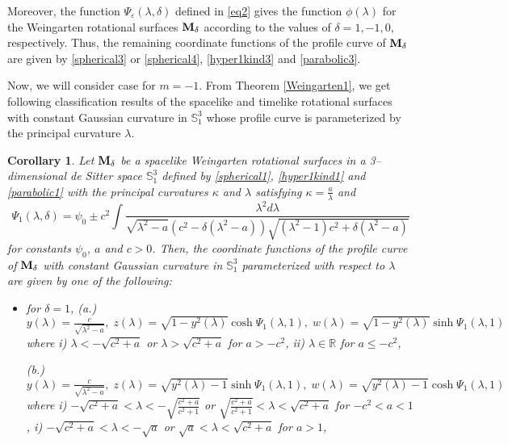 \documentclass{amsart}
\newtheorem{Corollary}[Theorem]{Corollary}
\theoremstyle{definition}
\numberwithin{equation}{section}
\begin{document}
Moreover, the function $\Psi_{\varepsilon}(\lambda,\delta)$
defined in \eqref{eq2} gives the function $\phi(\lambda)$ for the Weingarten rotational surfaces ${\bf M}_{\delta}$ according to the values of $\delta=1,-1,0$, respectively. 
Thus, the remaining coordinate functions of the profile curve of 
${\bf M}_{\delta}$
are given by \eqref{spherical3} or \eqref{spherical4}, \eqref{hyper1kind3} and \eqref{parabolic3}.

Now, we will consider case for $m=-1$. 
From Theorem \ref{Weingarten1}, we get following classification results of 
the spacelike and timelike rotational surfaces with constant Gaussian curvature in $\mathbb{S}^3_1$ whose profile curve is parameterized by the principal curvature $\lambda$. 
\begin{Corollary}
\label{spacelikeWeingarten1}
Let ${\bf M}_\delta$ be a spacelike Weingarten rotational surfaces in a 3--dimensional de Sitter space $\mathbb{S}^3_1$ defined by \eqref{spherical1}, \eqref{hyper1kind1} and 
\eqref{parabolic1} with the principal curvatures $\kappa$ and $\lambda$
satisfying $\kappa=\frac{a}{\lambda}$ and 
\begin{equation}
    \Psi_{1}(\lambda,\delta)=\psi_0\pm 
    c^2\int{\frac{\lambda^2 d\lambda}{\sqrt{\lambda^2-a}(c^2-\delta(\lambda^2-a))
    \sqrt{(\lambda^2-1)c^2+\delta(\lambda^2-a)}}}
\end{equation}
for constants $\psi_0$, $a$ and $c>0$.
Then, the coordinate functions of the profile curve of ${\bf M}_\delta$ with 
constant Gaussian curvature in $\mathbb{S}^3_1$ parameterized with respect to 
$\lambda$ are given by one of the following:
\begin{itemize}
    \item [1.] for $\delta=1$,
    \subitem (a.)
    $y(\lambda)=\frac{c}{\sqrt{\lambda^2-a}},\; 
    z(\lambda)=\sqrt{1-y^2(\lambda)}\cosh{\Psi_1(\lambda,1)},\;
    w(\lambda)=\sqrt{1-y^2(\lambda)}\sinh{\Psi_1(\lambda,1)}$
    where
    \subsubitem i) $\lambda<-\sqrt{c^2+a}$ or $\lambda>\sqrt{c^2+a}$ for $a>-c^2$,
    \subsubitem ii) $\lambda\in\mathbb{R}$ for 
    $a\leq -c^2$,
    
    \subitem (b.) 
     $y(\lambda)=\frac{c}{\sqrt{\lambda^2-a}},\; 
        z(\lambda)=\sqrt{y^2(\lambda)-1}
        \sinh{\Psi_1(\lambda,1)},\;
        w(\lambda)=\sqrt{y^2(\lambda)-1}
        \cosh{\Psi_1(\lambda,1)}$
        where
        \subsubitem i) $-\sqrt{c^2+a}<\lambda<-\sqrt{\frac{c^2+a}{c^2+1}}$ or $\sqrt{\frac{c^2+a}{c^2+1}}<\lambda<\sqrt{c^2+a}$ for $-c^2<a<1$,
        \subsubitem i) $-\sqrt{c^2+a}<\lambda<-\sqrt{a}$ or $\sqrt{a}<\lambda<\sqrt{c^2+a}$ for $a>1$,
        

\end{itemize}
\end{Corollary}
\end{document}
